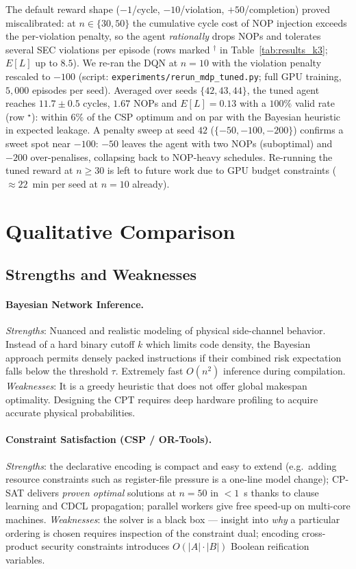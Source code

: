 \documentclass[letterpaper]{article}
\begin{document}
The default reward shape ($-1$/cycle, $-10$/violation, $+50$/completion)
proved miscalibrated: at $n \in \{30, 50\}$ the cumulative cycle cost of
NOP injection exceeds the per-violation penalty, so the agent
\emph{rationally} drops NOPs and tolerates several SEC violations per
episode (rows marked $^{\dagger}$ in Table~\ref{tab:results_k3};
$E[L]$ up to $8.5$).
We re-ran the DQN at $n=10$ with the violation penalty rescaled to
$-100$ (script: \texttt{experiments/rerun\_mdp\_tuned.py}; full GPU
training, $5{,}000$ episodes per seed). Averaged over seeds
$\{42, 43, 44\}$, the tuned agent reaches $11.7 \pm 0.5$ cycles,
$1.67$ NOPs and $E[L] = 0.13$ with a $100\%$ valid rate
(row $^{\star}$): within $6\%$ of the CSP optimum and on par with the
Bayesian heuristic in expected leakage. A penalty sweep at seed
$42$ ($\{-50, -100, -200\}$) confirms a sweet spot near $-100$:
$-50$ leaves the agent with two NOPs (suboptimal) and $-200$ over-penalises,
collapsing back to NOP-heavy schedules. Re-running the tuned reward at
$n \ge 30$ is left to future work due to GPU budget constraints
($\approx 22$~min per seed at $n=10$ already).

\section{Qualitative Comparison}
\label{sec:qualitative}

\subsection{Strengths and Weaknesses}

\paragraph{Bayesian Network Inference.}
\textit{Strengths}: Nuanced and realistic modeling of physical side-channel behavior. Instead of a hard binary cutoff $k$ which limits code density, the Bayesian approach permits densely packed instructions if their combined risk expectation falls below the threshold $\tau$. Extremely fast $O(n^2)$ inference during compilation.
\textit{Weaknesses}: It is a greedy heuristic that does not offer global makespan optimality. Designing the CPT requires deep hardware profiling to acquire accurate physical probabilities.

\paragraph{Constraint Satisfaction (CSP / OR-Tools).}
\textit{Strengths}: the declarative encoding is compact and easy to
extend (e.g.\ adding resource constraints such as register-file
pressure is a one-line model change); CP-SAT delivers \emph{proven
  optimal} solutions at $n = 50$ in $< 1$~s thanks to clause learning and
CDCL propagation; parallel workers give free speed-up on multi-core
machines.
\textit{Weaknesses}: the solver is a black box — insight into
\emph{why} a particular ordering is chosen requires inspection of the
constraint dual; encoding cross-product security constraints introduces
$O(|A| \cdot |B|)$ Boolean reification variables.
\end{document}
